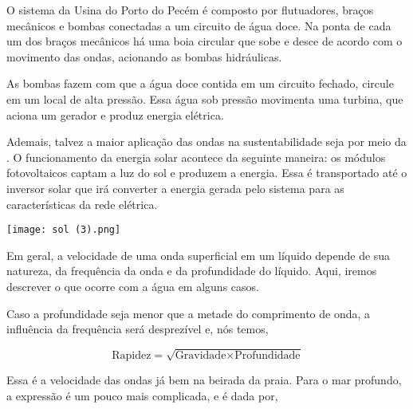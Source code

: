 \documentclass[book, 12pt, twoside, a5paper, english, brazil, sumario=tradicional, openany]{abntex2}
\begin{document}
O sistema da Usina do Porto do Pecém é composto por flutuadores, braços mecânicos e bombas conectadas a um circuito de água doce. Na ponta de cada um dos braços mecânicos há uma boia circular que sobe e desce de acordo com o movimento das ondas, acionando as bombas hidráulicas.

As bombas fazem com que a água doce contida em um circuito fechado, circule em um local de alta pressão. Essa água sob pressão movimenta uma turbina, que aciona um gerador e produz energia elétrica.

Ademais, talvez a maior aplicação das ondas na sustentabilidade seja por meio da {\color{celestialblue}{energia solar}}. O funcionamento da energia solar acontece da seguinte maneira: os módulos fotovoltaicos captam a luz do sol e produzem a energia. Essa é transportado até o inversor solar que irá converter a energia gerada pelo sistema para as características da rede elétrica.

\vspace{0.4cm}
\begin{center}
    \texttt{[image: sol (3).png]} 
\end{center}
\vspace{-0.6cm}

\vspace{-0.8cm}

{}

\vspace{-0.3cm}

Em geral, a velocidade de uma onda superficial em um líquido depende de sua natureza, da frequência da onda e da profundidade do líquido. Aqui, iremos descrever o que ocorre com a água em alguns casos.

Caso a profundidade seja menor que a metade do comprimento de onda, a influência da frequência será desprezível e, nós temos, 

\vspace{-0.3cm}

\begin{equation}
    \text{Rapidez} = \sqrt{\text{Gravidade} \times \text{Profundidade}} 
\end{equation}

\vspace{0.1cm}

Essa é a velocidade das ondas já bem na beirada da praia. Para o mar profundo, a expressão é um pouco mais complicada, e é dada por, 
\end{document}
